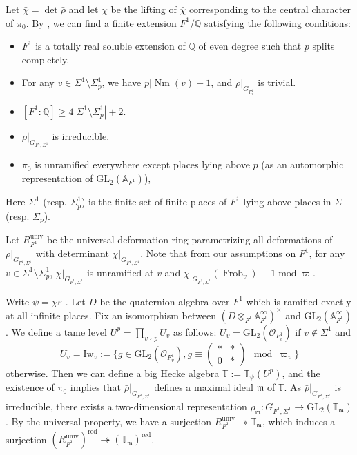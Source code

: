 \documentclass[a4paper, 12pt]{amsart}
\DeclareMathOperator{\modd}{mod}
\newcommand{\Q}{\mathbb{Q}}
\newcommand{\T}{\mathbb{T}}
\newcommand{\A}{\mathbb{A}}
\newcommand{\GL}{\mathrm{GL}}
\newcommand{\cO}{\mathcal{O}}
\newcommand{\km}{\mathfrak{m}}
\begin{document}
    Let $\bar{\chi}=\det \bar{\rho}$ and let $\chi$ be the lifting of $\bar{\chi}$ corresponding to the central character of $\pi_0$. By \cite[Fact 4.27]{Gee_2022}, we can find a finite extension $F^1/\Q$ satisfying the following conditions:
     \begin{itemize}
    	\item $F^1$ is a totally real soluble extension of $\mathbb{Q}$ of even degree such that $p$ splits completely.
    	\item  For any $v \in \Sigma^1 \setminus \Sigma^1_p$, we have $p| \operatorname{Nm}(v)-1$, and  $\bar{\rho}|_{G_{F^1_v}}$ is trivial.
    	\item $[F^1:\mathbb{Q}] \ge 4|\Sigma^1 \setminus \Sigma^1_p|+2$.
    	\item  $\bar{\rho}|_{G_{F^1, \Sigma^1}}$ is irreducible.
    	\item  $\pi_0$ is unramified everywhere except places lying above $p$ (as an automorphic representation of $\GL_2(\A_{F^1})$),
    	
    \end{itemize}
    Here $ \Sigma^1$ (resp. $\Sigma^1_p $) is the finite set of finite places of $F^1$ lying above places in $\Sigma$ (resp. $\Sigma_p $).
    
    Let $R_{F^1}^{\operatorname{univ}}$ be the universal deformation ring parametrizing all deformations of $\bar{\rho}|_{G_{F^1, \Sigma^1}}$ with determinant $\chi|_{G_{F^1, \Sigma^1}}$. Note that from our assumptions on $F^1$, for any $v \in \Sigma^1 \setminus \Sigma^1_p$, $\chi|_{G_{F^1, \Sigma^1}}$ is unramified at $v$ and $ \chi|_{G_{F^1, \Sigma^1}}(\operatorname{Frob}_v) \equiv 1 \modd \varpi$.
    
     Write $\psi=\chi\varepsilon$ . Let $D$ be the quaternion algebra over $F^1$ which is ramified exactly at all infinite places. Fix an isomorphism between $(D \otimes_{F^1}\A_{F^1}^\infty )^\times$ and $\GL_2(\A_{F^1}^\infty)$. We define a tame level $U^p=\prod_{v\nmid p}U_v$ as follows: $U_v=\GL_2(\cO_{F^1_v})$ if $v\notin \Sigma^1$ and 
    \[U_v=\mathrm{Iw}_v:=\{g\in\GL_2(\cO_{F^1_v}),g\equiv \begin{pmatrix}*&*\\0&*\end{pmatrix}\mod \varpi_v\}\]
    otherwise. Then we can define a big Hecke algebra $\T:=\T_\psi(U^p)$, and the existence of $\pi_0$ implies that $\bar{\rho}|_{G_{F^1, \Sigma^1}}$ defines a maximal ideal $\km$ of $\T$. As $\bar{\rho}|_{G_{F^1, \Sigma^1}}$ is irreducible, there exists a two-dimensional representation $\rho_\km: G_{F^1, \Sigma^1} \to \GL_2(\T_\km)$. By the universal property, we have a surjection $R_{F^1}^{\operatorname{univ}} \twoheadrightarrow \T_\km $, which induces a surjection $ (R_{F^1}^{\operatorname{univ}})^{\operatorname{red}} \twoheadrightarrow (\T_\km)^{\operatorname{red}}$.
    
\end{document}
